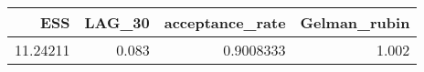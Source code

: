 \begin{longtable}{rrrr}
\toprule
ESS & LAG\_30 & acceptance\_rate & Gelman\_rubin \\ 
\midrule
11.24211 & 0.083 & 0.9008333 & 1.002 \\ 
\bottomrule
\end{longtable}

